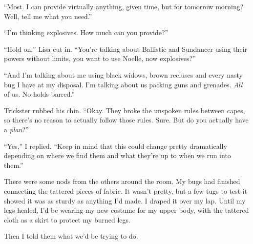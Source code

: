 ``Most.  I can provide virtually anything, given time, but for tomorrow morning?  Well, tell me what you need.''



``I'm thinking explosives.  How much can you provide?''



``Hold on,'' Lisa cut in.  ``You're talking about Ballistic and Sundancer using their powers without limits, you want to use Noelle, now explosives?''



``And I'm talking about me using black widows, brown recluses and every nasty bug I have at my disposal.  I'm talking about us packing guns and grenades.  \emph{All} of us.  No holds barred.''



Trickster rubbed his chin.  ``Okay.  They broke the unspoken rules between capes, so there's no reason to actually follow those rules.  Sure.  But do you actually have a \emph{plan}?''



``Yes,'' I replied.  ``Keep in mind that this could change pretty dramatically depending on where we find them and what they're up to when we run into them.''



There were some nods from the others around the room.  My bugs had finished connecting the tattered pieces of fabric.  It wasn't pretty, but a few tugs to test it showed it was as sturdy as anything I'd made.  I draped it over my lap.  Until my legs healed, I'd be wearing my new costume for my upper body, with the tattered cloth as a skirt to protect my burned legs.



Then I told them what we'd be trying to do.






